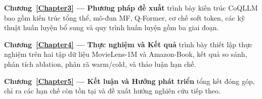 \textbf{Chương~\ref{Chapter3} --- Phương pháp đề xuất} trình bày kiến trúc CoQLLM bao gồm
kiến trúc tổng thể, mô-đun MF, Q-Former, cơ chế soft token, các kỹ thuật huấn luyện bổ sung
và quy trình huấn luyện gồm ba giai đoạn.

\textbf{Chương~\ref{Chapter4} --- Thực nghiệm và Kết quả} trình bày thiết lập thực
nghiệm trên hai tập dữ liệu MovieLens-1M và Amazon-Book, kết quả so sánh, phân tích ablation,
phân rã warm/cold, và thảo luận hạn chế.

\textbf{Chương~\ref{Chapter5} --- Kết luận và Hướng phát triển} tổng kết đóng góp, chỉ
ra các hạn chế còn tồn tại và đề xuất hướng nghiên cứu tiếp theo.
